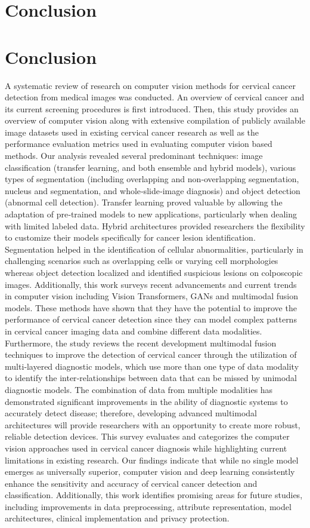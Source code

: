 \documentclass{svjour3}
\begin{document}
\section{Conclusion}

\section{Conclusion}
A systematic review of research on computer vision methods for cervical cancer detection from medical images was conducted. An overview of cervical cancer and its current screening procedures is first introduced. Then, this study provides an overview of computer vision along with extensive compilation of publicly available image datasets used in existing cervical cancer research as well as the performance evaluation metrics used in evaluating computer vision based methods. Our analysis revealed several predominant techniques: image classification (transfer learning, and both ensemble and hybrid models), various types of segmentation (including overlapping and non‑overlapping segmentation, nucleus and segmentation, and whole‑slide‑image diagnosis) and object detection (abnormal cell detection). Transfer learning proved valuable by allowing the adaptation of pre‑trained models to new applications, particularly when dealing with limited labeled data. Hybrid architectures provided researchers the flexibility to customize their models specifically for cancer lesion identification. Segmentation helped in the identification of cellular abnormalities, particularly in challenging scenarios such as overlapping cells or varying cell morphologies whereas object detection localized and identified suspicious lesions on colposcopic images.
Additionally, this work surveys recent advancements and current trends in computer vision including Vision Transformers, GANs and multimodal fusion models. These methods have shown that they have the potential to improve the performance of cervical cancer detection since they can model complex patterns in cervical cancer imaging data and combine different data modalities.
Furthermore, the study reviews the recent development multimodal fusion techniques to improve the detection of cervical cancer through the utilization of multi‑layered diagnostic models, which use more than one type of data modality to identify the inter‑relationships between data that can be missed by unimodal diagnostic models. The combination of data from multiple modalities has demonstrated significant improvements in the ability of diagnostic systems to accurately detect disease; therefore, developing advanced multimodal architectures will provide researchers with an opportunity to create more robust, reliable detection devices.
This survey evaluates and categorizes the computer vision approaches used in cervical cancer diagnosis while highlighting current limitations in existing research. Our findings indicate that while no single model emerges as universally superior, computer vision and deep learning consistently enhance the sensitivity and accuracy of cervical cancer detection and classification. Additionally, this work identifies promising areas for future studies, including improvements in data preprocessing, attribute representation, model architectures, clinical implementation and privacy protection.
\end{document}

